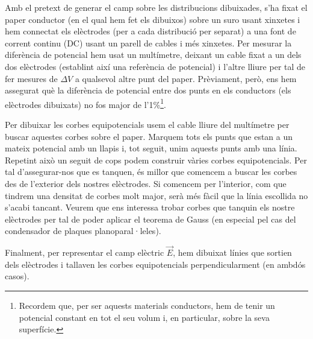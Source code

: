 \documentclass[a4paper,10.5pt]{report}
\begin{document}
	Amb el pretext de generar el camp sobre les distribucions dibuixades, s'ha fixat el paper conductor (en el qual hem fet els dibuixos) sobre un suro usant xinxetes i hem connectat els elèctrodes (per a cada distribució per separat) a una font de corrent continu (DC) usant un parell de cables i més xinxetes. Per mesurar la diferència de potencial hem usat un multímetre, deixant un cable fixat a un dels dos elèctrodes (establint així una referència de potencial) i l'altre lliure per tal de fer mesures de $\Delta V$ a qualsevol altre punt del paper. Prèviament, però, ens hem assegurat què la diferència de potencial entre dos punts en els conductors (els elèctrodes dibuixats) no fos major de l'1\%\footnote{Recordem que, per ser aquests materials conductors, hem de tenir un potencial constant en tot el seu volum i, en particular, sobre la seva superfície.}.

	Per dibuixar les corbes equipotencials usem el cable lliure del multímetre per buscar aquestes corbes sobre el paper. Marquem tots els punts que estan a un mateix potencial amb un llapis i, tot seguit, unim aquests punts amb una línia. Repetint això un seguit de cops podem construir vàries corbes equipotencials. Per tal d'assegurar-nos que es tanquen, és millor que comencem a buscar les corbes des de l'exterior dels nostres elèctrodes. Si comencem per l'interior, com que tindrem una densitat de corbes molt major, serà més fàcil que la línia escollida no s'acabi tancant. Veurem que ens interessa trobar corbes que tanquin els nostre elèctrodes per tal de poder aplicar el teorema de Gauss (en especial pel cas del condensador de plaques planoparal·leles).
	
	Finalment, per representar el camp elèctric $\vec{E}$, hem dibuixat línies que sortien dels elèctrodes i tallaven les corbes equipotencials perpendicularment (en ambdós casos). 
	
\end{document}
